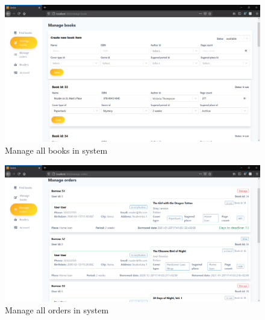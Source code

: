 \begin{figure}[H]
    \centering
    \includegraphics[width=\textwidth]{Include/Resources/FrontendScreens/React/librarianManageBooks.png}
    \caption{Manage all books in system}
    \label{fig:ScreenshotGUIlibrarianManageBooks}
\end{figure}




\begin{figure}[H]
    \centering
    \includegraphics[width=\textwidth]{Include/Resources/FrontendScreens/React/librarianManageOrders.png}
    \caption{Manage all orders in system}
    \label{fig:ScreenshotGUIlibrarianManageOrders}
\end{figure}




